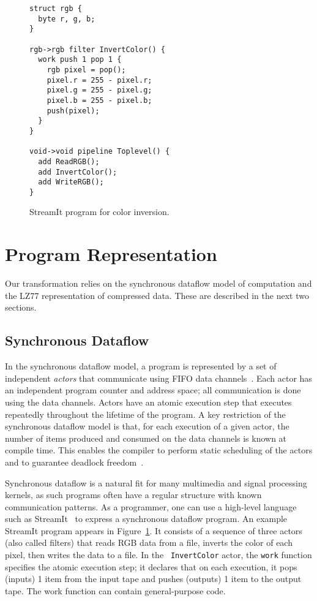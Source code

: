 \begin{figure}[t]
\scriptsize
\begin{verbatim}
struct rgb {
  byte r, g, b;
}

rgb->rgb filter InvertColor() {
  work push 1 pop 1 {
    rgb pixel = pop();
    pixel.r = 255 - pixel.r;
    pixel.g = 255 - pixel.g;
    pixel.b = 255 - pixel.b;
    push(pixel);
  }
}

void->void pipeline Toplevel() {
  add ReadRGB();
  add InvertColor();
  add WriteRGB();
}
\end{verbatim}
\caption{StreamIt program for color inversion.
\protect\label{fig:streamit}}
\end{figure}

\section{Program Representation}

Our transformation relies on the synchronous dataflow model of
computation and the LZ77 representation of compressed data.  These are
described in the next two sections.

\subsection{Synchronous Dataflow}

In the synchronous dataflow model, a program is represented by a set
of independent {\it actors} that communicate using FIFO data
channels~\cite{LM87-i}.  Each actor has an independent program counter
and address space; all communication is done using the data channels.
Actors have an atomic execution step that executes repeatedly
throughout the lifetime of the program.  A key restriction of the
synchronous dataflow model is that, for each execution of a given
actor, the number of items produced and consumed on the data channels
is known at compile time.  This enables the compiler to perform static
scheduling of the actors and to guarantee deadlock freedom~\cite{LM87-i}.

Synchronous dataflow is a natural fit for many multimedia and signal
processing kernels, as such programs often have a regular structure
with known communication patterns.  As a programmer, one can use a
high-level language such as StreamIt~\cite{streamitcc} to express a
synchronous dataflow program.  An example StreamIt program appears in
Figure~\ref{fig:streamit}.  It consists of a sequence of three actors
(also called filters) that reads RGB data from a file, inverts the
color of each pixel, then writes the data to a file.  In the {\tt
InvertColor} actor, the {\tt work} function specifies the atomic
execution step; it declares that on each execution, it pops (inputs) 1
item from the input tape and pushes (outputs) 1 item to the output
tape.  The work function can contain general-purpose code.

